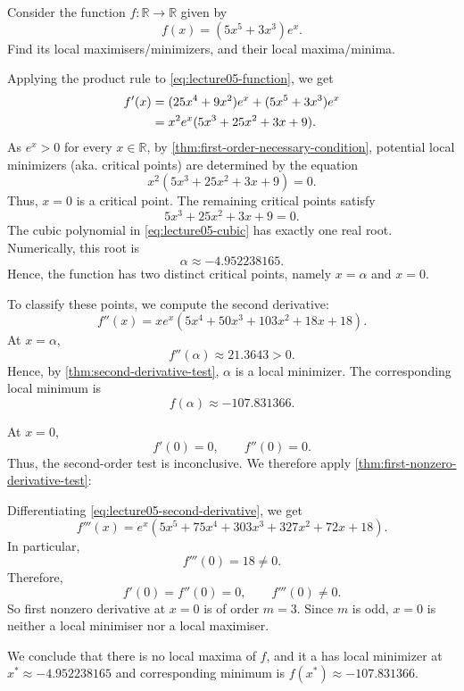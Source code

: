 \begin{exercise}
	Consider the function $f:\mathbb{R}\to\mathbb{R}$ given by
	\begin{equation}
		f(x)=(5x^5+3x^3)e^x.
		\label{eq:lecture05-function}
	\end{equation}
	Find its local maximisers/minimizers, and their local maxima/minima.
\end{exercise}
\begin{answer}
	Applying the product rule to \autoref{eq:lecture05-function}, we get
	\begin{align}
		f'(x)
		 & = (25x^4+9x^2)e^x+(5x^5+3x^3)e^x \notag \\
		 & = x^2e^x(5x^3+25x^2+3x+9).
		\label{eq:lecture05-first-derivative}
	\end{align}
	As $e^x>0$ for every $x\in\mathbb{R}$, by \autoref{thm:first-order-necessary-condition}, potential local minimizers (aka. critical points) are determined by the equation
	\begin{equation}
		x^2(5x^3+25x^2+3x+9)=0.
		\label{eq:lecture05-stationary}
	\end{equation}
	Thus, $x=0$ is a critical point. The remaining critical points satisfy
	\begin{equation}
		5x^3+25x^2+3x+9=0.
		\label{eq:lecture05-cubic}
	\end{equation}
	The cubic polynomial in \autoref{eq:lecture05-cubic} has exactly one real root. Numerically, this root is
	\[
		\alpha\approx -4.952238165.
	\]
	Hence, the function has two distinct critical points, namely $x=\alpha$ and $x=0$.

	To classify these points, we compute the second derivative:
	\begin{equation}
		f''(x)
		=xe^x(5x^4+50x^3+103x^2+18x+18).
		\label{eq:lecture05-second-derivative}
	\end{equation}
	At $x=\alpha$,
	\[
		f''(\alpha)\approx21.3643>0.
	\]
	Hence, by \autoref{thm:second-derivative-test}, $\alpha$ is a local minimizer. The corresponding local minimum is
	\[
		f(\alpha)\approx-107.831366.
	\]

	At $x=0$,
	\[
		f'(0)=0,\qquad f''(0)=0.
	\]
	Thus, the second-order test is inconclusive. We therefore apply \autoref{thm:first-nonzero-derivative-test}:

	Differentiating \autoref{eq:lecture05-second-derivative},
	we get
	\begin{equation}
		f'''(x) = e^x(5x^5+75x^4+303x^3 +327x^2+72x+18).
		\label{eq:taylor-expansion-and-higher-derivative-test-continued-1}
	\end{equation}
	In particular,
	\[
		f'''(0)=18\neq0.
	\]
	Therefore,
	\[
		f'(0)=f''(0)=0,
		\qquad f'''(0)\neq0.
	\]
	So first nonzero derivative at $x=0$ is of order $m=3$. Since $m$ is odd, $x=0$ is neither a local minimiser nor a local maximiser.

	We conclude that there is no local maxima of \( f \), and it a has local minimizer at \( x^\ast \approx-4.952238165 \) and corresponding minimum is \( f(x^\ast) \approx-107.831366 \).
\end{answer}
